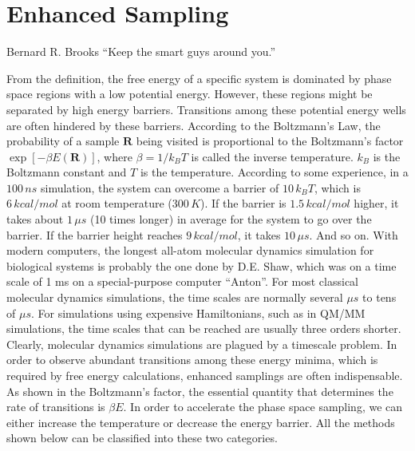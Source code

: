 \chapter{Enhanced Sampling\label{chapter:ES}}
\begin{chapquote}{Bernard R. Brooks%
	}
	``Keep the smart guys around you.''
\end{chapquote}
From the definition, the free energy of a specific system is dominated by phase space regions with a low potential energy. However, these regions might be separated by high energy barriers. Transitions among these potential energy wells are often hindered by these barriers. According to the Boltzmann's Law, the probability of a sample $\mathbf{R}$ being visited is proportional to the Boltzmann's factor $\exp{\left[-\beta E(\mathbf{R})\right]}$, where $\beta=1/k_BT$ is called the inverse temperature. $k_B$ is the Boltzmann constant and $T$ is the temperature. According to some experience, in a $100\, ns$ simulation, the system can overcome a barrier of $10\, k_BT$, which is $6\, kcal/mol$ at room temperature ($300\, K$). If the barrier is $1.5\, kcal/mol$ higher, it takes about $1\, \mu s$ (10 times longer) in average for the system to go over the barrier. If the barrier height reaches $9\, kcal/mol$, it takes $10\,\mu s$. And so on. With modern computers, the longest all-atom molecular dynamics simulation for biological systems is probably the one done by D.E. Shaw, which was on a time scale of 1 ms on a special-purpose computer ``Anton''. For most classical molecular dynamics simulations, the time scales are normally several $\mu s$ to tens of $\mu s$. For simulations using expensive Hamiltonians, such as in QM/MM simulations, the time scales that can be reached are usually three orders shorter. Clearly, molecular dynamics simulations are plagued by a timescale problem. In order to observe abundant transitions among these energy minima, which is required by free energy calculations, enhanced samplings are often indispensable. As shown in the Boltzmann's factor, the essential quantity that determines the rate of transitions is $\beta E$. In order to accelerate the phase space sampling, we can either increase the temperature or decrease the energy barrier. All the methods shown below can be classified into these two categories. 
\clearpage 

\clearpage 

\clearpage

\clearpage 

\clearpage 

\clearpage 

\clearpage 

\clearpage 

\clearpage

%
\clearpage

